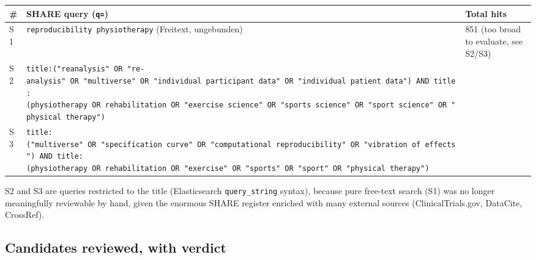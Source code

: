 {
\begin{longtable}[]{@{}
  >{\raggedright\arraybackslash}p{}
  >{\raggedright\arraybackslash}p{}
  >{\raggedleft\arraybackslash}p{}@{}}
\toprule\noalign{}
\begin{minipage}[b]{\linewidth}\raggedright
\#
\end{minipage} & \begin{minipage}[b]{\linewidth}\raggedright
SHARE query (\texttt{q=})
\end{minipage} & \begin{minipage}[b]{\linewidth}\raggedleft
Total hits
\end{minipage} \\
\midrule\noalign{}
\endhead
\bottomrule\noalign{}
\endlastfoot
S1 & \texttt{reproducibility\ physiotherapy} (Freitext, ungebunden) & 50 851 (too broad to evaluate, see S2/S3) \\
S2 & \texttt{title:("reanalysis"\ OR\ "re-analysis"\ OR\ "multiverse"\ OR\ "individual\ participant\ data"\ OR\ "individual\ patient\ data")\ AND\ title:(physiotherapy\ OR\ rehabilitation\ OR\ "exercise\ science"\ OR\ "sports\ science"\ OR\ "sport\ science"\ OR\ "physical\ therapy")} & 21 \\
S3 & \texttt{title:("multiverse"\ OR\ "specification\ curve"\ OR\ "computational\ reproducibility"\ OR\ "vibration\ of\ effects")\ AND\ title:(physiotherapy\ OR\ rehabilitation\ OR\ "exercise"\ OR\ "sports"\ OR\ "sport"\ OR\ "physical\ therapy")} & 2 \\
\end{longtable}
}

S2 and S3 are queries restricted to the title (Elasticsearch \texttt{query\_string} syntax), because pure free-text search (S1) was no longer meaningfully reviewable by hand, given the enormous SHARE register enriched with many external sources (ClinicalTrials.gov, DataCite, CrossRef).

\subsection{Candidates reviewed, with verdict}\label{candidates-reviewed-with-verdict}

